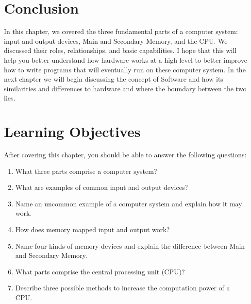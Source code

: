 \section {Conclusion}
In this chapter, we covered the three fundamental parts of a computer system:
input and output devices, Main and Secondary Memory, and the CPU. We discussed
their roles, relationships, and basic capabilities. I hope that this will help
you better understand how hardware works at a high level to better improve how
to write programs that will eventually run on these computer system. In the
next chapter we will begin discussing the concept of Software and how its
similarities and differences to hardware and where the boundary between the two
lies.

\section {Learning Objectives}
After covering this chapter, you should be able to answer the following questions:

\begin{enumerate}
\item What three parts comprise a computer system?
\item What are examples of common input and output devices?
\item Name an uncommon example of a computer system and explain how it may work.
\item How does memory mapped input and output work?
\item Name four kinds of memory devices and explain the difference between Main and Secondary Memory.
\item What parts comprise the central processing unit (CPU)?
\item Describe three possible methods to increase the computation power of a CPU.
\end{enumerate}
